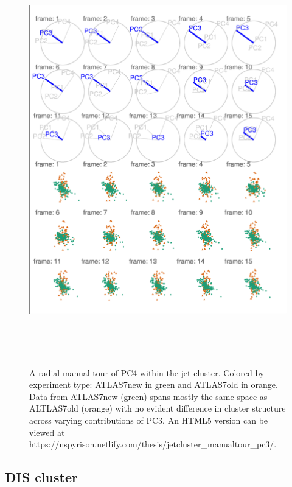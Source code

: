 \begin{Schunk}
\begin{figure}

{\centering \includegraphics[width=5.83in,height=7in]{spinifex_paper_files/figure-latex/JetClusterBad-1} 

}

\caption[A radial manual tour of PC4 within the jet cluster]{A radial manual tour of PC4 within the jet cluster. Colored by experiment type: ATLAS7new in green and ATLAS7old in orange. Data from ATLAS7new (green) spans mostly the same space as ALTLAS7old (orange) with no evident difference in cluster structure across varying contributions of PC3. An HTML5 version can be viewed at https://nspyrison.netlify.com/thesis/jetcluster\_manualtour\_pc3/.}\label{fig:JetClusterBad}
\end{figure}
\end{Schunk}

\hypertarget{dis-cluster}{%
\subsection{DIS cluster}\label{dis-cluster}}

